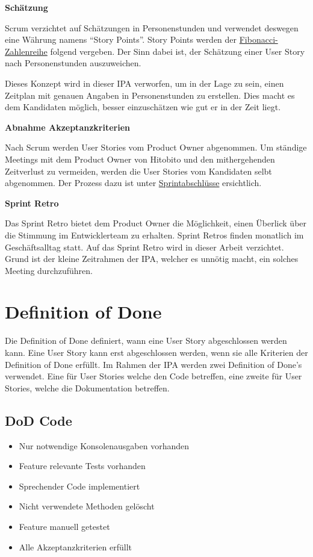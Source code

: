 \textbf{Schätzung}

Scrum verzichtet auf Schätzungen in Personenstunden und verwendet deswegen eine Währung namens ``Story Points''. Story Points werden
der \href{https://de.wikipedia.org/wiki/Fibonacci-Folge}{Fibonacci-Zahlenreihe} folgend vergeben. Der Sinn dabei ist, der Schätzung einer User Story 
nach Personenstunden auszuweichen.

Dieses Konzept wird in dieser IPA verworfen, um in der Lage zu sein, einen Zeitplan mit genauen Angaben in Personenstunden zu erstellen. Dies macht es dem Kandidaten
möglich, besser einzuschätzen wie gut er in der Zeit liegt.

\newpage

\textbf{Abnahme Akzeptanzkriterien}

Nach Scrum werden User Stories vom Product Owner abgenommen. Um ständige Meetings mit dem Product Owner von
Hitobito und den mithergehenden Zeitverlust zu vermeiden, werden die User Stories vom Kandidaten selbt abgenommen. Der Prozess dazu
ist unter \hyperref[sprintfinish]{\color{blue} Sprintabschlüsse} ersichtlich.

\textbf{Sprint Retro}

Das Sprint Retro bietet dem Product Owner die Möglichkeit, einen Überlick über die Stimmung im Entwicklerteam zu erhalten. Sprint Retros finden monatlich 
im Geschäftsalltag statt. Auf das Sprint Retro wird
in dieser Arbeit verzichtet. Grund ist der kleine Zeitrahmen der IPA, welcher es unnötig macht, ein solches Meeting durchzuführen.

\section{Definition of Done}
\label{dod}
Die Definition of Done definiert, wann eine User Story abgeschlossen werden kann. Eine User Story kann erst
abgeschlossen werden, wenn sie alle Kriterien der Definition of Done erfüllt. Im Rahmen der IPA werden zwei Definition of Done's verwendet.
Eine für User Stories welche den Code betreffen, eine zweite für User Stories, welche die Dokumentation betreffen.

\subsection{DoD Code}

\begin{itemize}
    \item Nur notwendige Konsolenausgaben vorhanden
    \item Feature relevante Tests vorhanden
    \item Sprechender Code implementiert
    \item Nicht verwendete Methoden gelöscht
    \item Feature manuell getestet
    \item Alle Akzeptanzkriterien erfüllt
\end{itemize}

